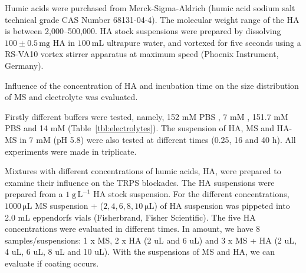 \documentclass[journal=langd5,manuscript=article]{achemso}
\begin{document}
Humic acids were purchased from Merck-Sigma-Aldrich (humic acid sodium salt technical grade CAS Number 68131-04-4). The molecular weight range of the HA is between  2,000--500,000. HA stock suspensions were prepared by dissolving  $\mathrm{100 \pm 0.5\,mg}$ HA in $100~\mathrm{mL}$ ultrapure water, and vortexed for five seconds using a RS-VA10 vortex stirrer apparatus at maximum speed (Phoenix Instrument, Germany). 

Influence of the concentration of HA and incubation time on the size  distribution of MS and electrolyte was evaluated.

Firstly different buffers were tested, namely, 
152 mM PBS ,
7 mM , 151.7 mM PBS
and 
14 mM  (Table~\ref{tbl:electrolytes}). The suspension of HA, MS and HA-MS in 7 mM  (pH  5.8) were also tested at different times (0.25, 16 and 40 h). All experiments were made in triplicate.


Mixtures  with different concentrations of humic acids, HA, were prepared to examine their influence on the TRPS blockades. The HA suspensions were prepared from a 
$\mathrm{1\;g\, L^{-1}}$
HA stock suspension. For the different concentrations,  $\mathrm{1000\, \mu L}$ MS suspension + 
($2, 4, 6, 8, 10~\mathrm{\mu L}$) 
of HA suspension was pippeted into 2.0 mL  eppendorfs vials (Fisherbrand, Fisher Scientific).
The five HA concentrations were evaluated in different times. In amount, we have 8 samples/suspensions: 1 x MS, 2 x HA (2 uL and 6 uL) and 3 x MS + HA (2 uL, 4 uL, 6 uL, 8 uL and 10 uL). With the suspensions of MS and HA, we can evaluate if coating occurs.

\end{document}
